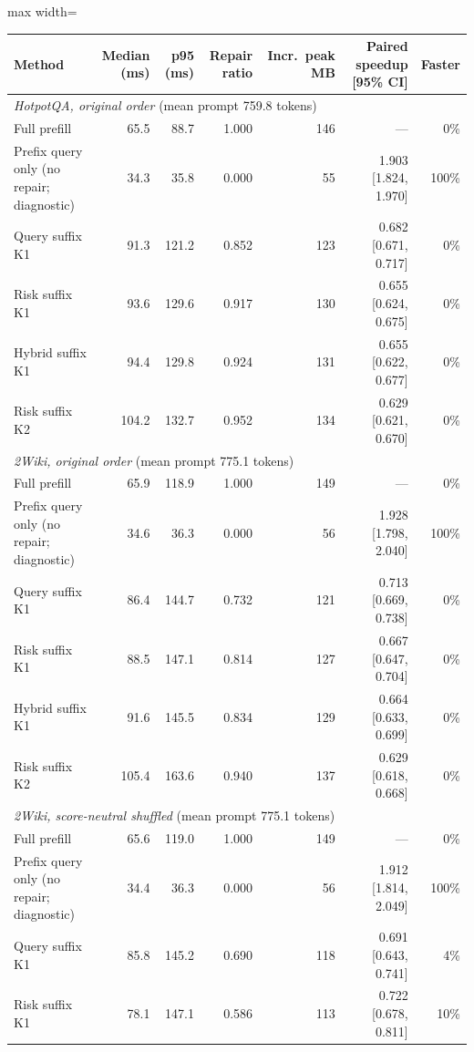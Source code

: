 \begin{table}[t]
\centering
\footnotesize
\begin{adjustbox}{max width=\textwidth}
\begin{tabular}{lrrrrrr}
\toprule
Method & Median (ms) & p95 (ms) & Repair ratio & Incr.\ peak MB & Paired speedup [95\% CI] & Faster \\
\midrule
\multicolumn{7}{l}{\emph{HotpotQA, original order} (mean prompt 759.8 tokens)} \\
Full prefill & 65.5 & 88.7 & 1.000 & 146 & --- & 0\% \\
Prefix query only (no repair; diagnostic) & 34.3 & 35.8 & 0.000 & 55 & 1.903 [1.824, 1.970] & 100\% \\
Query suffix K1 & 91.3 & 121.2 & 0.852 & 123 & 0.682 [0.671, 0.717] & 0\% \\
Risk suffix K1 & 93.6 & 129.6 & 0.917 & 130 & 0.655 [0.624, 0.675] & 0\% \\
Hybrid suffix K1 & 94.4 & 129.8 & 0.924 & 131 & 0.655 [0.622, 0.677] & 0\% \\
Risk suffix K2 & 104.2 & 132.7 & 0.952 & 134 & 0.629 [0.621, 0.670] & 0\% \\
\midrule
\multicolumn{7}{l}{\emph{2Wiki, original order} (mean prompt 775.1 tokens)} \\
Full prefill & 65.9 & 118.9 & 1.000 & 149 & --- & 0\% \\
Prefix query only (no repair; diagnostic) & 34.6 & 36.3 & 0.000 & 56 & 1.928 [1.798, 2.040] & 100\% \\
Query suffix K1 & 86.4 & 144.7 & 0.732 & 121 & 0.713 [0.669, 0.738] & 0\% \\
Risk suffix K1 & 88.5 & 147.1 & 0.814 & 127 & 0.667 [0.647, 0.704] & 0\% \\
Hybrid suffix K1 & 91.6 & 145.5 & 0.834 & 129 & 0.664 [0.633, 0.699] & 0\% \\
Risk suffix K2 & 105.4 & 163.6 & 0.940 & 137 & 0.629 [0.618, 0.668] & 0\% \\
\midrule
\multicolumn{7}{l}{\emph{2Wiki, score-neutral shuffled} (mean prompt 775.1 tokens)} \\
Full prefill & 65.6 & 119.0 & 1.000 & 149 & --- & 0\% \\
Prefix query only (no repair; diagnostic) & 34.4 & 36.3 & 0.000 & 56 & 1.912 [1.814, 2.049] & 100\% \\
Query suffix K1 & 85.8 & 145.2 & 0.690 & 118 & 0.691 [0.643, 0.741] & 4\% \\
Risk suffix K1 & 78.1 & 147.1 & 0.586 & 113 & 0.722 [0.678, 0.811] & 10\% \\

\end{tabular}
\end{adjustbox}
\end{table}
